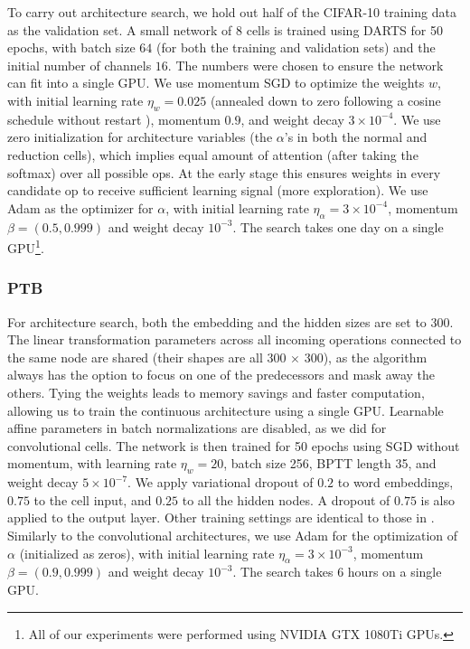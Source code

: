 \documentclass{article}
\begin{document}
To carry out architecture search,
we hold out half of the CIFAR-10 training data as the validation set.
A small network of 8 cells is trained using DARTS for 50 epochs,
with batch size $64$ (for both the training and validation sets) and the initial number of channels $16$.
The numbers were chosen to ensure the network can fit into a single GPU.
We use momentum SGD to optimize the weights $w$,
with initial learning rate $\eta_w = 0.025$ (annealed down to zero following a cosine schedule without restart \citep{loshchilov2016sgdr}),
momentum $0.9$, and weight decay $3 \times 10^{-4}$.
We use zero initialization for architecture variables (the $\alpha$'s in both the normal and reduction cells), which implies equal amount of attention (after taking the softmax) over all possible ops. At the early stage this ensures weights in every candidate op to receive sufficient learning signal (more exploration).
We use Adam \citep{kingma2014adam} as the optimizer for $\alpha$,
with initial learning rate $\eta_\alpha = 3\times 10^{-4}$, momentum $\beta = (0.5, 0.999)$ and weight decay $10^{-3}$. The search takes one day on a single GPU\footnote{All of our experiments were performed using NVIDIA GTX 1080Ti GPUs.}.

\subsubsection{PTB}
\label{sec:search-ptb}
For architecture search,
both the embedding and the hidden sizes are set to 300.
The linear transformation parameters across all incoming operations connected to the same node are shared (their shapes are all 300 $\times$ 300),
as the algorithm always has the option to focus on one of the predecessors and mask away the others.
Tying the weights leads to memory savings and faster computation,
allowing us to train the continuous architecture using a single GPU.
Learnable affine parameters in batch normalizations are disabled, as we did for convolutional cells.
The network is then trained for 50 epochs using SGD without momentum,
with learning rate $\eta_w=20$,
batch size 256,
BPTT length 35,
and weight decay $5 \times 10^{-7}$.
We apply
variational dropout \citep{gal2016theoretically} of $0.2$ to word embeddings,
$0.75$ to the cell input,
and $0.25$ to all the hidden nodes.
A dropout of $0.75$ is also applied to the output layer.
Other training settings are identical to those in \cite{merity2017regularizing, yang2017breaking}.
Similarly to the convolutional architectures, we use Adam for the optimization of $\alpha$ (initialized as zeros),
with initial learning rate $\eta_\alpha = 3\times 10^{-3}$,
momentum $\beta = (0.9, 0.999)$ and weight decay $10^{-3}$.
The search takes 6 hours on a single GPU.
\end{document}

